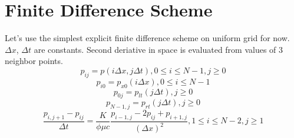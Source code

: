 \documentclass{article}
\begin{document}
\section{Finite Difference Scheme}

Let's use the simplest explicit finite difference scheme on uniform grid for
now. $\Delta x$, $\Delta t$ are constants. Second deriative in space is
evaluated from values of 3 neighbor points.
\begin{equation}
p_{i j} = p(i \Delta x, j \Delta t), 0 \leq i \leq N - 1, j \geq 0
\end{equation}
\begin{equation}
p_{i 0} = p_{x 0}(i \Delta x), 0 \leq i \leq N - 1
\end{equation}
\begin{equation}
p_{0 j} = p_{l t}(j \Delta t), j \geq 0
\end{equation}
\begin{equation}
p_{N - 1, j} = p_{r t}(j \Delta t), j \geq 0
\end{equation}
\begin{equation}
\frac{p_{i, j + 1} - p_{i j}}{\Delta t} = \frac{K}{\phi \mu c} \frac{p_{i - 1,
j} - 2 p_{i j} + p_{i + 1, j}}{(\Delta x)^2}, 1 \leq i \leq N - 2, j \geq 1
\end{equation}


\end{document}
